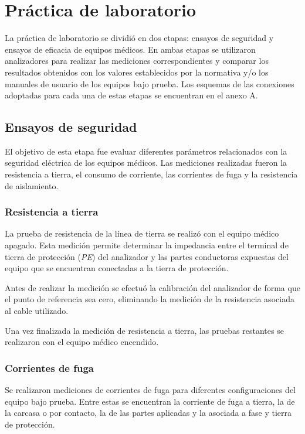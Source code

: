 \section{Práctica de laboratorio}

La práctica de laboratorio se dividió en dos etapas: ensayos de seguridad y ensayos de eficacia de equipos médicos. En ambas etapas se utilizaron analizadores para realizar las mediciones correspondientes y comparar los resultados obtenidos con los valores establecidos por la normativa y/o los manuales de usuario de los equipos bajo prueba.
    Los esquemas de las conexiones adoptadas para cada una de estas etapas se encuentran en el anexo A.

\subsection{Ensayos de seguridad}

El objetivo de esta etapa fue evaluar diferentes parámetros relacionados con la seguridad eléctrica de los equipos médicos. Las mediciones realizadas fueron la resistencia a tierra, el consumo de corriente, las corrientes de fuga y la resistencia de aislamiento.

\subsubsection{Resistencia a tierra}

La prueba de resistencia de la línea de tierra se realizó con el equipo médico apagado. Esta medición permite determinar la impedancia entre el terminal de tierra de protección (\textit{PE}) del analizador y las partes conductoras expuestas del equipo que se encuentran conectadas a la tierra de protección.

Antes de realizar la medición se efectuó la calibración del analizador de forma que el punto de referencia sea cero, eliminando la medición de la resistencia asociada al cable utilizado.

Una vez finalizada la medición de resistencia a tierra, las pruebas restantes se realizaron con el equipo médico encendido. 


\subsubsection{Corrientes de fuga}

Se realizaron mediciones de corrientes de fuga para diferentes configuraciones del equipo bajo prueba. Entre estas se encuentran la corriente de fuga a tierra, la de la carcasa o por contacto, la de las partes aplicadas y la asociada a fase y tierra de protección.


